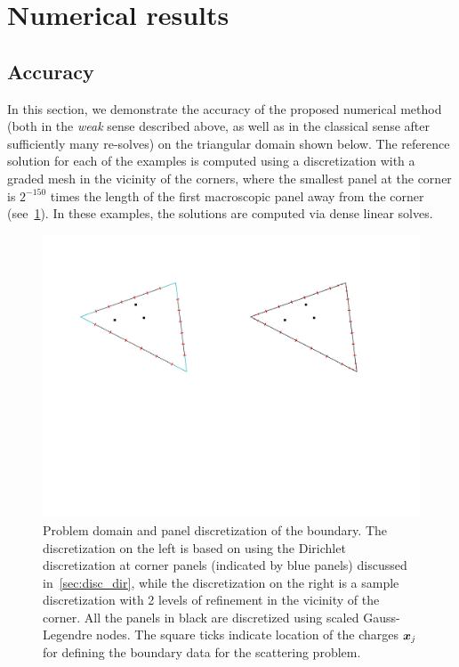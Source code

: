
\section{Numerical results \label{sec:num}}
\subsection{Accuracy}
In this section, we demonstrate the accuracy of the proposed numerical method (both in the {\it weak} sense 
described above, 
as well as in the classical sense after sufficiently many re-solves) on the triangular domain shown below. 
The reference solution for each of the examples is computed using a discretization with
a graded mesh in the vicinity of the corners, where the smallest panel at the corner is $2^{-150}$ times
the length of the first macroscopic panel away from the corner (see~\cref{fig:dom}). In these examples, the solutions are computed via dense linear solves.

\begin{figure}
\begin{center}
\includegraphics[width=0.7\linewidth]{media/discretization}
\caption{Problem domain and panel discretization of the boundary. The discretization on the left is based on using the Dirichlet
discretization at corner panels (indicated by blue panels) discussed in~\cref{sec:disc_dir}, while the discretization on the right is a sample discretization with 2 levels of refinement in the vicinity of the corner. All the panels in black are discretized using scaled Gauss-Legendre nodes. The square ticks indicate location of the charges $\boldsymbol{x}_{j}$ for defining the boundary data for the scattering problem.}
\label{fig:dom}
\end{center}
\end{figure}

